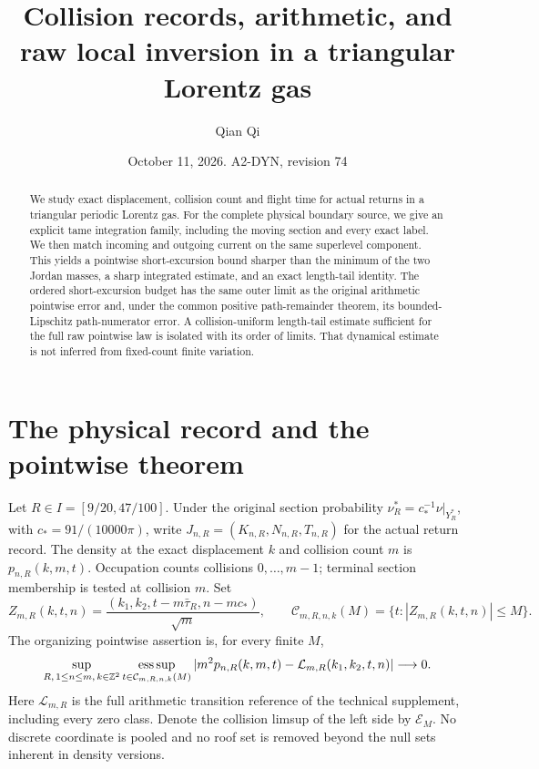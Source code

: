 \documentclass[11pt,reqno]{amsart}
\title[Collision records and raw local inversion]{Collision records, arithmetic, and raw local inversion in a triangular Lorentz gas}
\author{Qian Qi}
\date{October 11, 2026. A2-DYN, revision 74}
\numberwithin{equation}{section}
\theoremstyle{definition}
\theoremstyle{remark}\newtheorem{remark}[theorem]{Remark}
\newcommand{\esssup}{\operatorname*{ess\,sup}}
\begin{document}
\raggedbottom
\begin{abstract}
We study exact displacement, collision count and flight time for actual
returns in a triangular periodic Lorentz gas. For the complete physical
boundary source, we give an explicit tame integration family, including
the moving section and every exact label. We then match incoming and
outgoing current on the same superlevel component. This yields a
pointwise short-excursion bound sharper than the minimum of the two
Jordan masses, a sharp integrated estimate, and an exact length-tail
identity. The ordered short-excursion budget has the same outer limit
as the original arithmetic pointwise error and, under the common
positive path-remainder theorem, its bounded-Lipschitz path-numerator
error. A collision-uniform length-tail estimate sufficient for the
full raw pointwise law is isolated with its order of limits. That
dynamical estimate is not inferred from fixed-count finite variation.
\end{abstract}
\maketitle

\section{The physical record and the pointwise theorem}
\label{sec:v74-introduction}
Let $R\in I=[9/20,47/100]$. Under the original section probability
$\nu_R^*=c_*^{-1}\nu|_{Y_R^*}$, with $c_*=91/(10000\pi)$, write
$J_{n,R}=(K_{n,R},N_{n,R},T_{n,R})$ for the actual return record.
The density at the exact displacement $k$ and collision count $m$
is $p_{n,R}(k,m,t)$. Occupation counts collisions $0,\ldots,m-1$;
terminal section membership is tested at collision $m$. Set
\[
 Z_{m,R}(k,t,n)=\frac{(k_1,k_2,t-m\bar\tau_R,n-mc_*)}{\sqrt m},
 \qquad \mathcal C_{m,R,n,k}(M)=\{t:|Z_{m,R}(k,t,n)|\le M\}.
\]
The organizing pointwise assertion is, for every finite $M$,
\begin{equation}\label{eq:v74-original-target}
 \sup_{R,\,1\le n\le m,\,k\in\Z^2}
 \esssup_{t\in\mathcal C_{m,R,n,k}(M)}
 |m^2p_{n,R}(k,m,t)-\mathcal L_{m,R}(k_1,k_2,t,n)|\longrightarrow0.
\end{equation}
Here $\mathcal L_{m,R}$ is the full arithmetic transition reference
of the technical supplement, including every zero class. Denote the
collision limsup of the left side by $\mathcal E_M$. No discrete
coordinate is pooled and no roof set is removed beyond the null sets
inherent in density versions.
\end{document}
